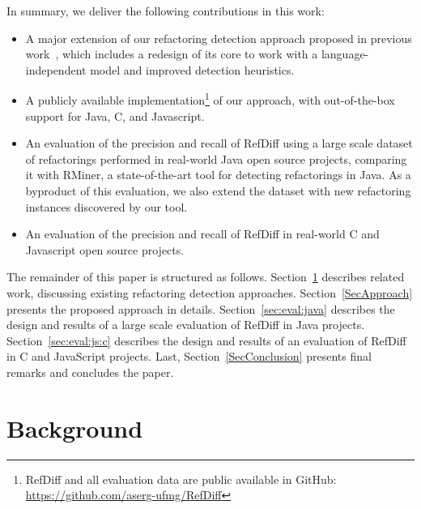 In summary, we deliver the following contributions in this work:
\begin{itemize}
\item A major extension of our refactoring detection approach proposed in previous work~\citep{msr2017}, which includes a redesign of its core to work with a language-independent model and improved detection heuristics.
\item A publicly available implementation\footnote{RefDiff and all evaluation data are public available in GitHub:\\
\url{https://github.com/aserg-ufmg/RefDiff}}
of our approach, with out-of-the-box support for Java, C, and Javascript.
\item An evaluation of the precision and recall of RefDiff using a large scale dataset of refactorings performed in real-world Java open source projects, comparing it with RMiner, a state-of-the-art tool for detecting refactorings in Java. As a byproduct of this evaluation, we also extend the dataset with new refactoring instances discovered by our tool.
\item An evaluation of the precision and recall of RefDiff in real-world C and Javascript open source projects.
\end{itemize}

The remainder of this paper is structured as follows.
Section~\ref{SecBackground} describes related work, discussing existing refactoring detection approaches.
Section~\ref{SecApproach} presents the proposed approach in details.
Section~\ref{sec:eval:java} describes the design and results of a large scale evaluation of RefDiff in Java projects.
Section~\ref{sec:eval:js:c} describes the design and results of an evaluation of RefDiff in C and JavaScript projects.
Last, Section~\ref{SecConclusion} presents final remarks and concludes the paper.






\section{Background}
\label{SecBackground}

